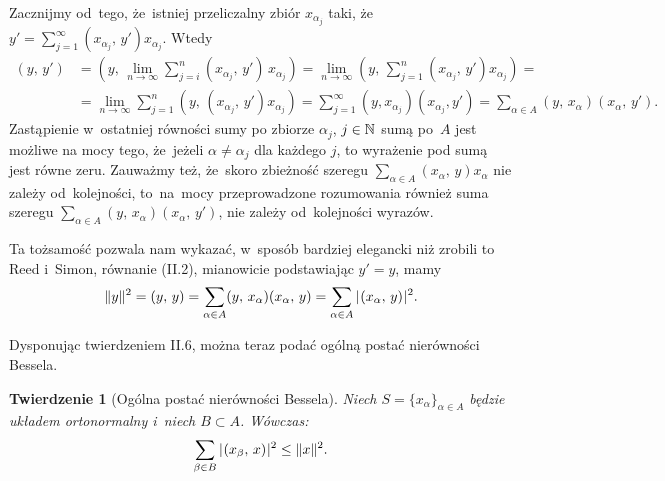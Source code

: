 \documentclass[a4paper,11pt]{article}
\numberwithin{equation}{section}
\newtheorem{theorem}{Twierdzenie}
\begin{document}
Zacznijmy od~tego, że~istniej przeliczalny zbiór $x_{ \alpha_{ j } }$
taki,
że~$y' = \sum_{ j = 1 }^{ \infty } ( x_{ \alpha_{ j } }, \, y' ) x_{ \alpha_{ j } }$.
Wtedy
\begin{equation}
  \label{eq:RS-Vol-I-s01-24}
  \begin{split}
    ( y, \, y' )
    &=
      ( y, \, \lim_{ n \to \infty } \sum_{ j = i }^{ n }
      ( x_{ \alpha_{ j } }, \,  y' ) \, x_{ \alpha_{ j } } )
      =
      \lim_{ n \to \infty } ( y, \, \sum_{ j = 1 }^{ n }
      ( x_{ \alpha_{ j } }, \, y' ) x_{ \alpha_{ j } } ) = \\
    &=
      \lim_{ n \to \infty } \sum_{ j = 1 }^{ n } ( y, \, ( x_{ \alpha_{ j } }, \, y' )
      x_{ \alpha_{ j } } )
      =
      \sum_{ j = 1 }^{ \infty } ( y, x_{ \alpha_{ j } } ) ( x_{ \alpha_{ j } }, y' )
      =
      \sum_{ \alpha \in A } ( y, \, x_{ \alpha } ) ( x_{ \alpha }, \,  y' ).
  \end{split}
\end{equation}
Zastąpienie w~ostatniej równości sumy po zbiorze
$\alpha_{ j }$, $j \in \mathbb{N}$ sumą po~$A$ jest możliwe na mocy tego,
że~jeżeli $\alpha \neq \alpha_{ j }$ dla każdego $j$, to wyrażenie pod
sumą jest równe zeru. Zauważmy też, że~skoro zbieżność szeregu
$\sum_{ \alpha \in A } ( x_{ \alpha }, \, y ) x_{ \alpha }$ nie zależy
od~kolejności, to~na~mocy przeprowadzone rozumowania również suma
szeregu
$\sum_{ \alpha \in A } ( y, \, x_{ \alpha } ) ( x_{ \alpha }, \, y' )$, nie
zależy od~kolejności wyrazów.

Ta tożsamość pozwala nam wykazać, w~sposób bardziej elegancki niż
zrobili to Reed i~Simon, równanie (II.2), mianowicie podstawiając
$y' = y$, mamy
\begin{equation}
  \label{eq:RS-Vol-I-s01-25}
  \lVert{  y  }\rVert^{ 2 } = ( y, \, y ) =
  \sum_{ \alpha \in A } ( y, \, x_{ \alpha } ) ( x_{ \alpha }, \, y )
  = \sum_{ \alpha \in A } | \hspace{0.05em}  ( x_{ \alpha }, \,  y )  \hspace{0.05em} |^{ 2 }.
\end{equation}

\VerSpaceFour



\noindent
{} Dysponując twierdzeniem II.6, można teraz podać ogólną
postać nierówności Bessela.




\begin{theorem}[Ogólna postać nierówności Bessela]

  Niech $S = \{ x_{ \alpha } \}_{ \alpha \in A }$ będzie układem
  ortonormalny i~niech $B \subset A$. Wówczas:
  \begin{equation}
    \label{eq:RS-Vol-I-s01-26}
    \sum_{ \beta \in B } | \hspace{0.05em}  ( x_{ \beta }, \, x )  \hspace{0.05em} |^{ 2 } \leq \lVert{  x  }\rVert^{ 2 }.
  \end{equation}

\end{theorem}
\end{document}
